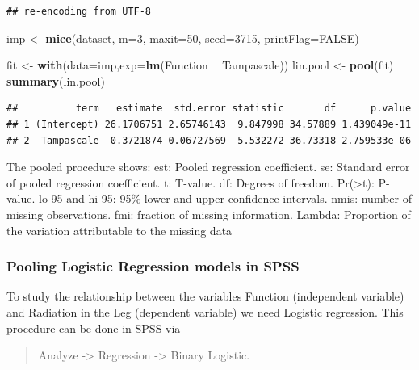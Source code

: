\documentclass[
]{book}
\newenvironment{Shaded}{\begin{snugshade}}{\end{snugshade}}
\newcommand{\DataTypeTok}[1]{\textcolor[rgb]{0.13,0.29,0.53}{#1}}
\newcommand{\DecValTok}[1]{\textcolor[rgb]{0.00,0.00,0.81}{#1}}
\newcommand{\KeywordTok}[1]{\textcolor[rgb]{0.13,0.29,0.53}{\textbf{#1}}}
\newcommand{\NormalTok}[1]{#1}
\newcommand{\OperatorTok}[1]{\textcolor[rgb]{0.81,0.36,0.00}{\textbf{#1}}}
\newcommand{\OtherTok}[1]{\textcolor[rgb]{0.56,0.35,0.01}{#1}}
\newcommand{\StringTok}[1]{\textcolor[rgb]{0.31,0.60,0.02}{#1}}
\begin{document}
\begin{verbatim}
## re-encoding from UTF-8
\end{verbatim}

\begin{Shaded}
\begin{Highlighting}[]
\NormalTok{imp <-}\StringTok{ }\KeywordTok{mice}\NormalTok{(dataset, }\DataTypeTok{m=}\DecValTok{3}\NormalTok{, }\DataTypeTok{maxit=}\DecValTok{50}\NormalTok{, }\DataTypeTok{seed=}\DecValTok{3715}\NormalTok{, }\DataTypeTok{printFlag=}\OtherTok{FALSE}\NormalTok{)}

\NormalTok{fit <-}\StringTok{ }\KeywordTok{with}\NormalTok{(}\DataTypeTok{data=}\NormalTok{imp,}\DataTypeTok{exp=}\KeywordTok{lm}\NormalTok{(Function }\OperatorTok{~}\StringTok{ }\NormalTok{Tampascale))}
\NormalTok{lin.pool <-}\StringTok{ }\KeywordTok{pool}\NormalTok{(fit)}
\KeywordTok{summary}\NormalTok{(lin.pool)}
\end{Highlighting}
\end{Shaded}

\begin{verbatim}
##          term   estimate  std.error statistic       df      p.value
## 1 (Intercept) 26.1706751 2.65746143  9.847998 34.57889 1.439049e-11
## 2  Tampascale -0.3721874 0.06727569 -5.532272 36.73318 2.759533e-06
\end{verbatim}

The pooled procedure shows:
est: Pooled regression coefficient.
se: Standard error of pooled regression coefficient.
t: T-value.
df: Degrees of freedom.
Pr(\textgreater\textbar t\textbar): P-value.
lo 95 and hi 95: 95\% lower and upper confidence intervals.
nmis: number of missing observations.
fmi: fraction of missing information.
Lambda: Proportion of the variation attributable to the missing data

\hypertarget{pooling-logistic-regression-models-in-spss}{%
\subsubsection{Pooling Logistic Regression models in SPSS}\label{pooling-logistic-regression-models-in-spss}}

To study the relationship between the variables Function (independent variable) and Radiation in the Leg (dependent variable) we need Logistic regression. This procedure can be done in SPSS via

\begin{quote}
Analyze -\textgreater{} Regression -\textgreater{} Binary Logistic.
\end{quote}
\end{document}
